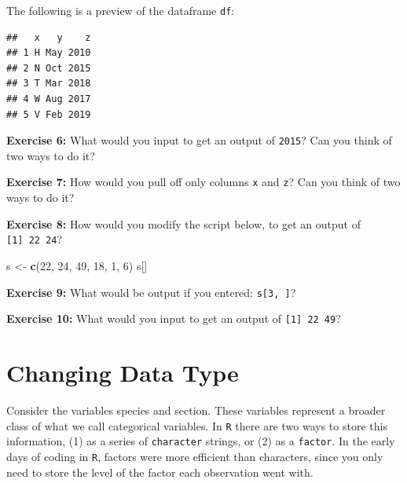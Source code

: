 \documentclass[]{article}
\newenvironment{Shaded}{\begin{snugshade}}{\end{snugshade}}
\newcommand{\KeywordTok}[1]{\textcolor[rgb]{0.13,0.29,0.53}{\textbf{#1}}}
\newcommand{\DecValTok}[1]{\textcolor[rgb]{0.00,0.00,0.81}{#1}}
\newcommand{\StringTok}[1]{\textcolor[rgb]{0.31,0.60,0.02}{#1}}
\newcommand{\NormalTok}[1]{#1}
\begin{document}
The following is a preview of the dataframe \texttt{df}:

\begin{verbatim}
##   x   y    z
## 1 H May 2010
## 2 N Oct 2015
## 3 T Mar 2018
## 4 W Aug 2017
## 5 V Feb 2019
\end{verbatim}

\vspace{0.25cm}

\textbf{Exercise 6:} What would you input to get an output of
\texttt{2015}? Can you think of two ways to do it?

\vspace{0.25cm}

\textbf{Exercise 7:} How would you pull off only columns \texttt{x} and
\texttt{z}? Can you think of two ways to do it?

\vspace{0.25cm}

\textbf{Exercise 8:} How would you modify the script below, to get an
output of \texttt{{[}1{]}\ 22\ 24}?

\vspace{0.25cm}

\begin{Shaded}
\begin{Highlighting}[]
\NormalTok{s <-}\StringTok{ }\KeywordTok{c}\NormalTok{(}\DecValTok{22}\NormalTok{, }\DecValTok{24}\NormalTok{, }\DecValTok{49}\NormalTok{, }\DecValTok{18}\NormalTok{, }\DecValTok{1}\NormalTok{, }\DecValTok{6}\NormalTok{)}
\NormalTok{s[]}
\end{Highlighting}
\end{Shaded}

\vspace{0.25cm}

\textbf{Exercise 9:} What would be output if you entered:
\texttt{s{[}3,\ {]}}?

\vspace{0.25cm}

\textbf{Exercise 10:} What would you input to get an output of
\texttt{{[}1{]}\ 22\ 49}?

\vspace{0.25cm}

\section{Changing Data Type}\label{changing-data-type}

Consider the variables species and section. These variables represent a
broader class of what we call categorical variables. In \texttt{R} there
are two ways to store this information, (1) as a series of
\texttt{character} strings, or (2) as a \texttt{factor}. In the early
days of coding in \texttt{R}, factors were more efficient than
characters, since you only need to store the level of the factor each
observation went with.
\end{document}
